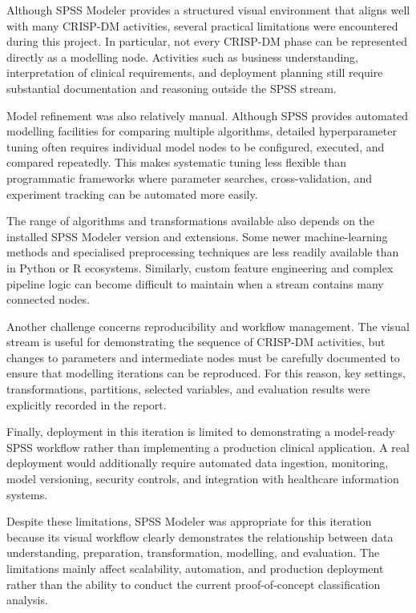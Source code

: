 Although SPSS Modeler provides a structured visual environment that aligns well with many CRISP-DM activities, several practical limitations were encountered during this project. In particular, not every CRISP-DM phase can be represented directly as a modelling node. Activities such as business understanding, interpretation of clinical requirements, and deployment planning still require substantial documentation and reasoning outside the
SPSS stream.

Model refinement was also relatively manual. Although SPSS provides automated modelling facilities for comparing multiple algorithms, detailed hyperparameter tuning often requires individual model nodes to be configured,
executed, and compared repeatedly. This makes systematic tuning less flexible than programmatic frameworks where parameter searches, cross-validation, and experiment tracking can be automated more easily.

The range of algorithms and transformations available also depends on the
installed SPSS Modeler version and extensions. Some newer machine-learning methods and specialised preprocessing techniques are less readily available
than in Python or R ecosystems. Similarly, custom feature engineering and complex pipeline logic can become difficult to maintain when a stream contains
many connected nodes.

Another challenge concerns reproducibility and workflow management. The visual stream is useful for demonstrating the sequence of CRISP-DM activities, but changes to parameters and intermediate nodes must be carefully documented to
ensure that modelling iterations can be reproduced. For this reason, key settings, transformations, partitions, selected variables, and evaluation
results were explicitly recorded in the report.

Finally, deployment in this iteration is limited to demonstrating a model-ready SPSS workflow rather than implementing a production clinical
application. A real deployment would additionally require automated data ingestion, monitoring, model versioning, security controls, and integration with healthcare information systems.

Despite these limitations, SPSS Modeler was appropriate for this iteration because its visual workflow clearly demonstrates the relationship between data understanding, preparation, transformation, modelling, and evaluation.
The limitations mainly affect scalability, automation, and production deployment rather than the ability to conduct the current proof-of-concept
classification analysis.